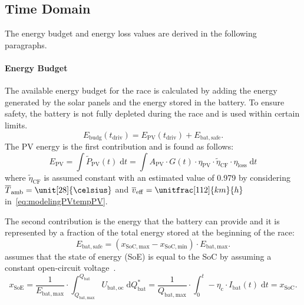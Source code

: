 \subsection{Time Domain}
\label{sec:strategyTimeDomain}
The energy budget and energy loss values are derived in the following paragraphs.

\paragraph{Energy Budget}
The available energy budget for the race is calculated by adding the energy generated by the solar panels and the energy stored in the battery. To ensure safety, the battery is not fully depleted during the race and is used within certain limits.
\begin{equation}
	E_\mathrm{budg}(t_\mathrm{driv}) = E_\mathrm{PV}(t_\mathrm{driv}) + E_\mathrm{bat,safe}. \label{eq:strategyEbudgetTotTime}
\end{equation}
The PV energy is the first contribution and is found as follows:
\begin{equation}
	E_\mathrm{PV} = \int \tilde{P}_\mathrm{PV}(t) \;\mathrm{d}t = \int A_\mathrm{PV} \cdot G(t) \cdot \eta_\mathrm{PV} \cdot \tilde{\eta}_\mathrm{CF} \cdot \eta_\mathrm{loss} \;\mathrm{d}t
\end{equation}
where $\tilde{\eta}_\mathrm{CF}$ is assumed constant with an estimated value of 0.979 by considering $\overline{T}_\mathrm{amb} = \unit[28]{\celsius}$ and $\overline{v}_\mathrm{eff} = \unitfrac[112]{km}{h}$ in~\cref{eq:modelingPVtempPV}.

The second contribution is the energy that the battery can provide and it is represented by a fraction of the total energy stored at the beginning of the race:
\begin{equation}
	E_\mathrm{bat,safe} = (x_\mathrm{SoC,max} - x_\mathrm{SoC,min}) \cdot E_\mathrm{bat,max}. \label{eq:strategyEbatSafe}
\end{equation}
 assumes that the state of energy (SoE) is equal to the SoC by assuming a constant open-circuit voltage~\cite{fawidmer:2016mt}.
\begin{equation}
	x_\mathrm{SoE} = \frac{1}{E_\mathrm{bat,max}} \cdot \int_{Q_\mathrm{bat,max}}^{Q_\mathrm{bat}} U_\mathrm{bat,oc} \;\mathrm{d} Q_\mathrm{bat}^* = \frac{1}{Q_\mathrm{bat,max}} \cdot \int_{0}^{t} - \eta_\mathrm{c} \cdot I_\mathrm{bat}(t) \;\mathrm{d}t = x_\mathrm{SoC}. \label{eq:strategySoCequalSoE}
\end{equation}


